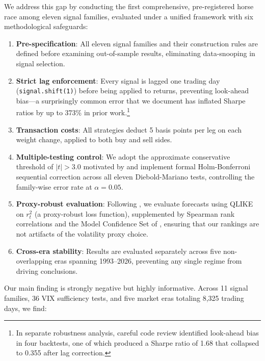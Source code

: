 \documentclass[12pt,a4paper]{article}
\begin{document}
We address this gap by conducting the first comprehensive, pre-registered horse race among eleven signal families, evaluated under a unified framework with six methodological safeguards:

\begin{enumerate}[label=(\roman*)]
    \item \textbf{Pre-specification}: All eleven signal families and their construction rules are defined before examining out-of-sample results, eliminating data-snooping in signal selection.
    \item \textbf{Strict lag enforcement}: Every signal is lagged one trading day (\texttt{signal.shift(1)}) before being applied to returns, preventing look-ahead bias---a surprisingly common error that we document has inflated Sharpe ratios by up to 373\% in prior work.\footnote{In separate robustness analysis, careful code review identified look-ahead bias in four backtests, one of which produced a Sharpe ratio of 1.68 that collapsed to 0.355 after lag correction.}
    \item \textbf{Transaction costs}: All strategies deduct 5 basis points per leg on each weight change, applied to both buy and sell sides.
    \item \textbf{Multiple-testing control}: We adopt the approximate conservative threshold of $|t| > 3.0$ motivated by \citet{harvey2016} and implement formal Holm-Bonferroni sequential correction across all eleven Diebold-Mariano tests, controlling the family-wise error rate at $\alpha = 0.05$.
    \item \textbf{Proxy-robust evaluation}: Following \citet{patton2011}, we evaluate forecasts using QLIKE on $r_t^2$ (a proxy-robust loss function), supplemented by Spearman rank correlations and the Model Confidence Set of \citet{hansen2011mcs}, ensuring that our rankings are not artifacts of the volatility proxy choice.
    \item \textbf{Cross-era stability}: Results are evaluated separately across five non-overlapping eras spanning 1993--2026, preventing any single regime from driving conclusions.
\end{enumerate}

Our main finding is strongly negative but highly informative. Across 11 signal families, 36 VIX sufficiency tests, and five market eras totaling 8,325 trading days, we find:
\end{document}
